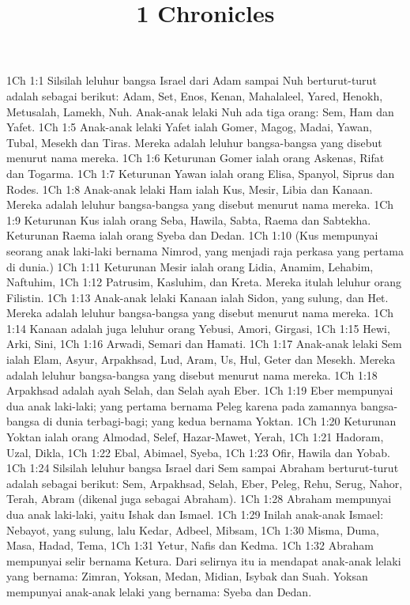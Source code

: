 

\title{1 Chronicles}

1Ch 1:1  Silsilah leluhur bangsa Israel dari Adam sampai Nuh berturut-turut adalah sebagai berikut: Adam, Set, Enos, Kenan, Mahalaleel, Yared, Henokh, Metusalah, Lamekh, Nuh. Anak-anak lelaki Nuh ada tiga orang: Sem, Ham dan Yafet.
1Ch 1:5  Anak-anak lelaki Yafet ialah Gomer, Magog, Madai, Yawan, Tubal, Mesekh dan Tiras. Mereka adalah leluhur bangsa-bangsa yang disebut menurut nama mereka.
1Ch 1:6  Keturunan Gomer ialah orang Askenas, Rifat dan Togarma.
1Ch 1:7  Keturunan Yawan ialah orang Elisa, Spanyol, Siprus dan Rodes.
1Ch 1:8  Anak-anak lelaki Ham ialah Kus, Mesir, Libia dan Kanaan. Mereka adalah leluhur bangsa-bangsa yang disebut menurut nama mereka.
1Ch 1:9  Keturunan Kus ialah orang Seba, Hawila, Sabta, Raema dan Sabtekha. Keturunan Raema ialah orang Syeba dan Dedan.
1Ch 1:10  (Kus mempunyai seorang anak laki-laki bernama Nimrod, yang menjadi raja perkasa yang pertama di dunia.)
1Ch 1:11  Keturunan Mesir ialah orang Lidia, Anamim, Lehabim, Naftuhim,
1Ch 1:12  Patrusim, Kasluhim, dan Kreta. Mereka itulah leluhur orang Filistin.
1Ch 1:13  Anak-anak lelaki Kanaan ialah Sidon, yang sulung, dan Het. Mereka adalah leluhur bangsa-bangsa yang disebut menurut nama mereka.
1Ch 1:14  Kanaan adalah juga leluhur orang Yebusi, Amori, Girgasi,
1Ch 1:15  Hewi, Arki, Sini,
1Ch 1:16  Arwadi, Semari dan Hamati.
1Ch 1:17  Anak-anak lelaki Sem ialah Elam, Asyur, Arpakhsad, Lud, Aram, Us, Hul, Geter dan Mesekh. Mereka adalah leluhur bangsa-bangsa yang disebut menurut nama mereka.
1Ch 1:18  Arpakhsad adalah ayah Selah, dan Selah ayah Eber.
1Ch 1:19  Eber mempunyai dua anak laki-laki; yang pertama bernama Peleg karena pada zamannya bangsa-bangsa di dunia terbagi-bagi; yang kedua bernama Yoktan.
1Ch 1:20  Keturunan Yoktan ialah orang Almodad, Selef, Hazar-Mawet, Yerah,
1Ch 1:21  Hadoram, Uzal, Dikla,
1Ch 1:22  Ebal, Abimael, Syeba,
1Ch 1:23  Ofir, Hawila dan Yobab.
1Ch 1:24  Silsilah leluhur bangsa Israel dari Sem sampai Abraham berturut-turut adalah sebagai berikut: Sem, Arpakhsad, Selah, Eber, Peleg, Rehu, Serug, Nahor, Terah, Abram (dikenal juga sebagai Abraham).
1Ch 1:28  Abraham mempunyai dua anak laki-laki, yaitu Ishak dan Ismael.
1Ch 1:29  Inilah anak-anak Ismael: Nebayot, yang sulung, lalu Kedar, Adbeel, Mibsam,
1Ch 1:30  Misma, Duma, Masa, Hadad, Tema,
1Ch 1:31  Yetur, Nafis dan Kedma.
1Ch 1:32  Abraham mempunyai selir bernama Ketura. Dari selirnya itu ia mendapat anak-anak lelaki yang bernama: Zimran, Yoksan, Medan, Midian, Isybak dan Suah. Yoksan mempunyai anak-anak lelaki yang bernama: Syeba dan Dedan.
